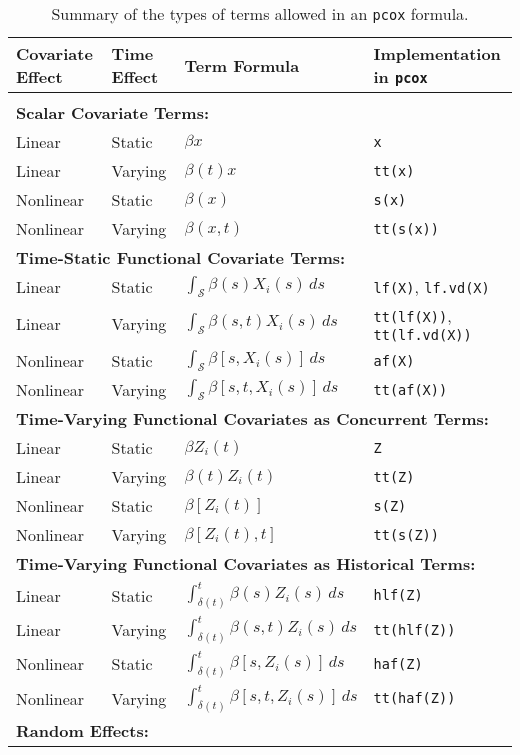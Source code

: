 \documentclass[12pt]{article}
\begin{document}
\begin{table}[t]
\centering
\caption{Summary of the types of terms allowed in an \texttt{pcox} formula.\label{tab:terms}}
\begin{tabular}{llll}
\bf Covariate Effect & \bf Time Effect & \bf Term Formula & \bf Implementation in \texttt{pcox}  \\[1ex]
\hline \\[-1.5ex]
\multicolumn{4}{l}{\bf Scalar Covariate Terms:} \\
Linear	& Static	& $\beta x$	& \texttt{x} \\
Linear	& Varying	& $\beta(t) x$	& \texttt{tt(x)} \\
Nonlinear	& Static	& $\beta(x)$	& \texttt{s(x)} \\
Nonlinear	& Varying	& $\beta(x,t)$	& \texttt{tt(s(x))} \\[2ex]
\multicolumn{4}{l}{\bf Time-Static Functional Covariate Terms:} \\
Linear	& Static	& $\int_{\mathcal{S}} \beta(s)X_i(s)\,ds$		& \texttt{lf(X)}, \texttt{lf.vd(X)} \\
Linear	& Varying	& $\int_{\mathcal{S}} \beta(s,t)X_i(s)\,ds$	& \texttt{tt(lf(X))}, \texttt{tt(lf.vd(X))} \\
Nonlinear	& Static	& $\int_{\mathcal{S}} \beta[s,X_i(s)]\,ds$		& \texttt{af(X)}\\
Nonlinear	& Varying	& $\int_{\mathcal{S}} \beta[s,t,X_i(s)]\, ds$	& \texttt{tt(af(X))} \\[2ex]
\multicolumn{4}{l}{\bf Time-Varying Functional Covariates as Concurrent Terms:} \\
Linear	& Static	& $\beta Z_i(t)$		& \texttt{Z} \\
Linear	& Varying	& $\beta(t) Z_i(t)$	& \texttt{tt(Z)} \\
Nonlinear	& Static	& $\beta[Z_i(t)]$		& \texttt{s(Z)} \\
Nonlinear	& Varying	& $\beta[Z_i(t), t]$		& \texttt{tt(s(Z))} \\[2ex]
\multicolumn{4}{l}{\bf Time-Varying Functional Covariates as Historical Terms:} \\
Linear	& Static	& $\int_{\delta(t)}^t \beta(s)Z_i(s)\,ds$	& \texttt{hlf(Z)} \\
Linear	& Varying	& $\int_{\delta(t)}^t \beta(s,t)Z_i(s)\,ds$	& \texttt{tt(hlf(Z))} \\
Nonlinear	& Static	& $\int_{\delta(t)}^t \beta[s, Z_i(s)]\,ds$	& \texttt{haf(Z)} \\
Nonlinear	& Varying	& $\int_{\delta(t)}^t \beta[s, t, Z_i(s)]\,ds$	& \texttt{tt(haf(Z))} \\[2ex]
\multicolumn{4}{l}{\bf Random Effects:} \\
\end{tabular}
\end{table}
\end{document}
